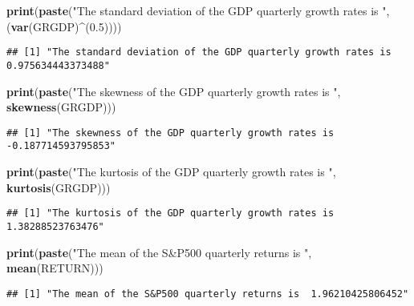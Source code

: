 \documentclass[]{article}
\newenvironment{Shaded}{\begin{snugshade}}{\end{snugshade}}
\newcommand{\KeywordTok}[1]{\textcolor[rgb]{0.13,0.29,0.53}{\textbf{#1}}}
\newcommand{\FloatTok}[1]{\textcolor[rgb]{0.00,0.00,0.81}{#1}}
\newcommand{\StringTok}[1]{\textcolor[rgb]{0.31,0.60,0.02}{#1}}
\newcommand{\OperatorTok}[1]{\textcolor[rgb]{0.81,0.36,0.00}{\textbf{#1}}}
\newcommand{\NormalTok}[1]{#1}
\begin{document}
\begin{Shaded}
\begin{Highlighting}[]
\KeywordTok{print}\NormalTok{(}\KeywordTok{paste}\NormalTok{(}\StringTok{"The standard deviation of the GDP quarterly growth rates is "}\NormalTok{, (}\KeywordTok{var}\NormalTok{(GRGDP)}\OperatorTok{^}\NormalTok{(}\FloatTok{0.5}\NormalTok{))))}
\end{Highlighting}
\end{Shaded}

\begin{verbatim}
## [1] "The standard deviation of the GDP quarterly growth rates is  0.975634443373488"
\end{verbatim}

\begin{Shaded}
\begin{Highlighting}[]
\KeywordTok{print}\NormalTok{(}\KeywordTok{paste}\NormalTok{(}\StringTok{"The skewness of the GDP quarterly growth rates is "}\NormalTok{, }\KeywordTok{skewness}\NormalTok{(GRGDP)))}
\end{Highlighting}
\end{Shaded}

\begin{verbatim}
## [1] "The skewness of the GDP quarterly growth rates is  -0.187714593795853"
\end{verbatim}

\begin{Shaded}
\begin{Highlighting}[]
\KeywordTok{print}\NormalTok{(}\KeywordTok{paste}\NormalTok{(}\StringTok{"The kurtosis of the GDP quarterly growth rates is "}\NormalTok{, }\KeywordTok{kurtosis}\NormalTok{(GRGDP)))}
\end{Highlighting}
\end{Shaded}

\begin{verbatim}
## [1] "The kurtosis of the GDP quarterly growth rates is  1.38288523763476"
\end{verbatim}

\begin{Shaded}
\begin{Highlighting}[]
\KeywordTok{print}\NormalTok{(}\KeywordTok{paste}\NormalTok{(}\StringTok{"The mean of the S&P500 quarterly returns is "}\NormalTok{, }\KeywordTok{mean}\NormalTok{(RETURN)))}
\end{Highlighting}
\end{Shaded}

\begin{verbatim}
## [1] "The mean of the S&P500 quarterly returns is  1.96210425806452"
\end{verbatim}
\end{document}
